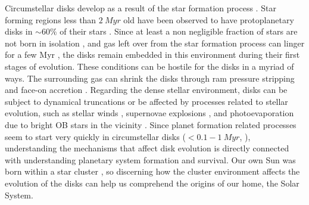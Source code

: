\documentclass[fleqn,usenatbib]{mnras}
\begin{document}
Circumstellar disks develop as a result of the star formation process \citep{williams2011}. Star forming regions less than $\SI{2}{Myr}$ old have been observed to have protoplanetary disks in $\sim60\%$ of their stars \citep{fedele2010}. Since at least a non negligible fraction of stars are not born in isolation \citep{bressert2010,king2012}, and gas left over from the star formation process can linger for a few Myr \citep{goodwin2009,portegieszwart2010}, the disks remain embedded in this environment during their first stages of evolution. These conditions can be hostile for the disks in a myriad of ways. The surrounding gas can shrink the disks through ram pressure stripping and face-on accretion \citep{wijnen2016, wijnen2017}. Regarding the dense stellar environment, disks can be subject to dynamical truncations \citep{vincke2015,portegieszwart2016,vincke2016} or be affected by processes related to stellar evolution, such as stellar winds \citep{pelupessy2012}, supernovae explosions \citep{close2017}, and photoevaporation due to bright OB stars in the vicinity \citep[e.g.][]{guarcello2016,haworth2017}. Since planet formation related processes seem to start very quickly in circumstellar disks ($< 0.1 - \SI{1}{Myr}$, \citet{najita2014,manara2018}), understanding the mechanisms that affect disk evolution is directly connected with understanding planetary system formation and survival. Our own Sun was born within a star cluster \citep{portegieszwart2009}, so discerning how the cluster environment affects the evolution of the disks can help us comprehend the origins of our home, the Solar System. 
\end{document}
